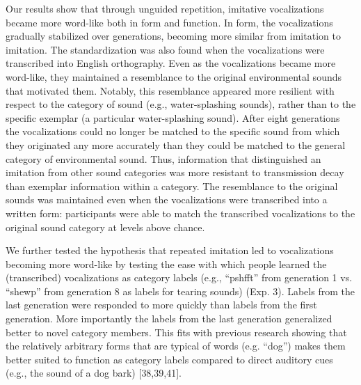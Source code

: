 \documentclass[english,floatsintext,man]{apa6}
\theoremstyle{definition}
\theoremstyle{definition}
\theoremstyle{definition}
\theoremstyle{remark}
\begin{document}
Our results show that through unguided repetition, imitative
vocalizations became more word-like both in form and function. In form,
the vocalizations gradually stabilized over generations, becoming more
similar from imitation to imitation. The standardization was also found
when the vocalizations were transcribed into English orthography. Even
as the vocalizations became more word-like, they maintained a
resemblance to the original environmental sounds that motivated them.
Notably, this resemblance appeared more resilient with respect to the
category of sound (e.g., water-splashing sounds), rather than to the
specific exemplar (a particular water-splashing sound). After eight
generations the vocalizations could no longer be matched to the specific
sound from which they originated any more accurately than they could be
matched to the general category of environmental sound. Thus,
information that distinguished an imitation from other sound categories
was more resistant to transmission decay than exemplar information
within a category. The resemblance to the original sounds was maintained
even when the vocalizations were transcribed into a written form:
participants were able to match the transcribed vocalizations to the
original sound category at levels above chance.

We further tested the hypothesis that repeated imitation led to
vocalizations becoming more word-like by testing the ease with which
people learned the (transcribed) vocalizations as category labels (e.g.,
\enquote{pshfft} from generation 1 vs. \enquote{shewp} from generation 8
as labels for tearing sounds) (Exp. 3). Labels from the last generation
were responded to more quickly than labels from the first generation.
More importantly the labels from the last generation generalized better
to novel category members. This fits with previous research showing that
the relatively arbitrary forms that are typical of words (e.g.
\enquote{dog}) makes them better suited to function as category labels
compared to direct auditory cues (e.g., the sound of a dog bark)
{[}38,39,41{]}.
\end{document}
